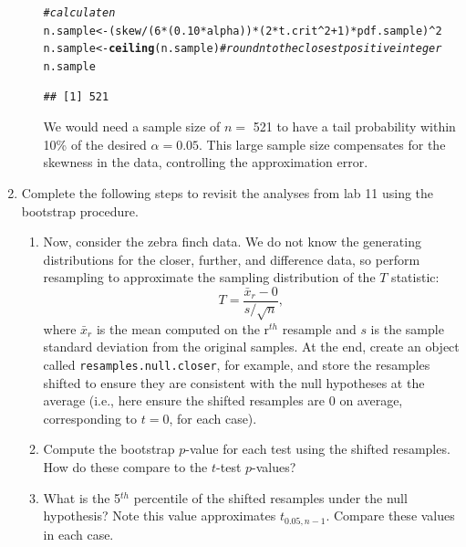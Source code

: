 \documentclass{article}\usepackage[]{graphicx}\usepackage[]{xcolor}
\makeatletter
\newcommand{\hlnum}[1]{\textcolor[rgb]{0.686,0.059,0.569}{#1}}%
\newcommand{\hlcom}[1]{\textcolor[rgb]{0.678,0.584,0.686}{\textit{#1}}}%
\newcommand{\hlopt}[1]{\textcolor[rgb]{0,0,0}{#1}}%
\newcommand{\hldef}[1]{\textcolor[rgb]{0.345,0.345,0.345}{#1}}%
\newcommand{\hlkwb}[1]{\textcolor[rgb]{0.69,0.353,0.396}{#1}}%
\newcommand{\hlkwd}[1]{\textcolor[rgb]{0.737,0.353,0.396}{\textbf{#1}}}%
\newenvironment{kframe}{%
 \def\at@end@of@kframe{}%
 \ifinner\ifhmode%
  \def\at@end@of@kframe{\end{minipage}}%
  \begin{minipage}{\columnwidth}%
 \fi\fi%
 \def\FrameCommand##1{\hskip\@totalleftmargin \hskip-\fboxsep
 \colorbox{shadecolor}{##1}\hskip-\fboxsep
     \hskip-\linewidth \hskip-\@totalleftmargin \hskip\columnwidth}%
 \MakeFramed {\advance\hsize-\width
   \@totalleftmargin\z@ \linewidth\hsize
   \@setminipage}}%
 {\par\unskip\endMakeFramed%
 \at@end@of@kframe}
\newenvironment{knitrout}{}{} %
\makeatother
\begin{document}
\begin{enumerate}
\begin{enumerate}
\begin{knitrout}
\begin{kframe}
\begin{alltt}
\hlcom{#calculate n }
\hldef{n.sample} \hlkwb{<-} \hldef{(skew}\hlopt{/}\hldef{(}\hlnum{6}\hlopt{*}\hldef{(}\hlnum{0.10}\hlopt{*}\hldef{alpha))}\hlopt{*}\hldef{(}\hlnum{2}\hlopt{*}\hldef{t.crit}\hlopt{^}\hlnum{2}\hlopt{+}\hlnum{1}\hldef{)}\hlopt{*}\hldef{pdf.sample)}\hlopt{^}\hlnum{2}
\hldef{n.sample} \hlkwb{<-} \hlkwd{ceiling}\hldef{(n.sample)} \hlcom{#round n to the closest positive integer}
\hldef{n.sample}
\end{alltt}
\begin{verbatim}
## [1] 521
\end{verbatim}
\end{kframe}
\end{knitrout}
We would need a sample size of $n = $ 521 to have a tail probability within 10\% of the desired
  $\alpha=0.05$. This large sample size compensates for the skewness in the data, controlling the approximation error.
\end{enumerate}
\item Complete the following steps to revisit the analyses from lab 11 using the
bootstrap procedure.
\begin{enumerate}
\item Now, consider the zebra finch data. We do not know the generating distributions
for the closer, further, and difference data, so perform resampling to approximate the 
sampling distribution of the $T$ statistic:
  \[T = \frac{\bar{x}_r - 0}{s/\sqrt{n}},\]
  where $\bar{x}_r$ is the mean computed on the r$^{th}$ resample and $s$ is the
  sample standard deviation from the original samples. At the end, create an
  object called \texttt{resamples.null.closer}, for example, and store the 
  resamples shifted to ensure they are consistent with the null hypotheses at the average 
  (i.e., here ensure the shifted resamples are 0 on average, corresponding
  to $t=0$, for each case). 
  \item Compute the bootstrap $p$-value for each test using the shifted resamples. 
  How do these compare to the $t$-test $p$-values?
    \item What is the 5$^{th}$ percentile of the shifted resamples under the null hypothesis? 
  Note this value approximates $t_{0.05, n-1}$. Compare these values in each case.

\end{enumerate}
\end{enumerate}
\end{document}
